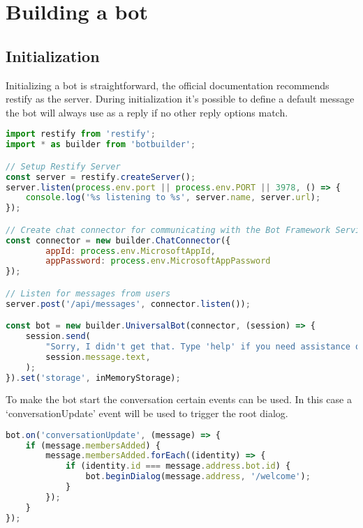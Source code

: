 \section{Building a bot}

\subsection{Initialization}

Initializing a bot is straightforward, the official documentation recommends restify\cite{restify} as the server. During initialization it's possible to define a default message the bot will always use as a reply if no other reply options match.

\begin{lstlisting}[language=JavaScript,caption=Initialization of a chatbot,label=listing:botframework-init]
import restify from 'restify';
import * as builder from 'botbuilder';

// Setup Restify Server
const server = restify.createServer();
server.listen(process.env.port || process.env.PORT || 3978, () => {
	console.log('%s listening to %s', server.name, server.url); 
});

// Create chat connector for communicating with the Bot Framework Service
const connector = new builder.ChatConnector({
		appId: process.env.MicrosoftAppId,
		appPassword: process.env.MicrosoftAppPassword
});

// Listen for messages from users 
server.post('/api/messages', connector.listen());

const bot = new builder.UniversalBot(connector, (session) => {
	session.send(
		"Sorry, I didn't get that. Type 'help' if you need assistance or try a different sentence.",
		session.message.text,
	);
}).set('storage', inMemoryStorage);
\end{lstlisting}

To make the bot start the conversation certain events can be used. In this case a `conversationUpdate' event will be used to trigger the root dialog.

\begin{lstlisting}[language=JavaScript,caption=The root event of a bot,label=listing:botframework-init-message]
bot.on('conversationUpdate', (message) => {
	if (message.membersAdded) {
		message.membersAdded.forEach((identity) => {
			if (identity.id === message.address.bot.id) {
				bot.beginDialog(message.address, '/welcome');
			}
		});
	}
});
\end{lstlisting}

